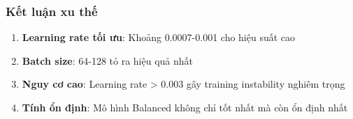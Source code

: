 \subsubsection{Kết luận xu thế}
\begin{enumerate}
    \item \textbf{Learning rate tối ưu}: Khoảng 0.0007-0.001 cho hiệu suất cao
    \item \textbf{Batch size}: 64-128 tỏ ra hiệu quả nhất
    \item \textbf{Nguy cơ cao}: Learning rate > 0.003 gây training instability nghiêm trọng
    \item \textbf{Tính ổn định}: Mô hình Balanced không chỉ tốt nhất mà còn ổn định nhất
\end{enumerate}







